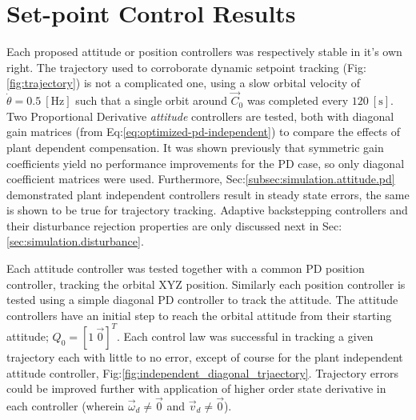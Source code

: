 \section{Set-point Control Results}
\label{sec:simulation.autopilot}
Each proposed attitude or position controllers was respectively stable in it's own right. The trajectory used to corroborate dynamic setpoint tracking (Fig:\ref{fig:trajectory}) is not a complicated one, using a slow orbital velocity of $\dot{\theta}=0.5~[\text{Hz}]$ such that a single orbit around $\vec{C}_0$ was completed every $120~[\text{s}]$. Two Proportional Derivative \emph{attitude} controllers are tested, both with diagonal gain matrices (from Eq:\ref{eq:optimized-pd-independent}) to compare the effects of plant dependent compensation. It was shown previously that symmetric gain coefficients yield no performance improvements for the PD case, so only diagonal coefficient matrices were used. Furthermore, Sec:\ref{subsec:simulation.attitude.pd} demonstrated plant independent controllers result in steady state errors, the same is shown to be true for trajectory tracking. Adaptive backstepping controllers and their disturbance rejection properties are only discussed next in Sec:\ref{sec:simulation.disturbance}. 
\par
Each attitude controller was tested together with a common PD position controller, tracking the orbital XYZ position. Similarly each position controller is tested using a simple diagonal PD controller to track the attitude. The attitude controllers have an initial step to reach the orbital attitude from their starting attitude; $Q_0=[1~\vec{0}]^T$. Each control law was successful in tracking a given trajectory each with little to no error, except of course for the plant independent attitude controller, Fig:\ref{fig:independent_diagonal_trjaectory}. Trajectory errors could be improved further with application of higher order state derivative in each controller (wherein $\vec{\omega}_d\not=\vec{0}$ and $\vec{v}_d\not=\vec{0}$).
